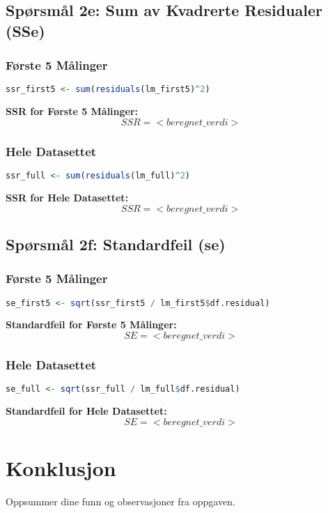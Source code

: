 \documentclass{article}
\begin{document}
\subsection{Spørsmål 2e: Sum av Kvadrerte Residualer (SSe)}
\subsubsection{Første 5 Målinger}
\begin{lstlisting}[language=R]
ssr_first5 <- sum(residuals(lm_first5)^2)
\end{lstlisting}
\textbf{SSR for Første 5 Målinger:} \[ SSR = <beregnet\_verdi> \]

\subsubsection{Hele Datasettet}
\begin{lstlisting}[language=R]
ssr_full <- sum(residuals(lm_full)^2)
\end{lstlisting}
\textbf{SSR for Hele Datasettet:} \[ SSR = <beregnet\_verdi> \]

\subsection{Spørsmål 2f: Standardfeil (se)}
\subsubsection{Første 5 Målinger}
\begin{lstlisting}[language=R]
se_first5 <- sqrt(ssr_first5 / lm_first5$df.residual)
\end{lstlisting}
\textbf{Standardfeil for Første 5 Målinger:} \[ SE = <beregnet\_verdi> \]

\subsubsection{Hele Datasettet}
\begin{lstlisting}[language=R]
se_full <- sqrt(ssr_full / lm_full$df.residual)
\end{lstlisting}
\textbf{Standardfeil for Hele Datasettet:} \[ SE = <beregnet\_verdi> \]

\section{Konklusjon}
Oppsummer dine funn og observasjoner fra oppgaven.
\end{document}
